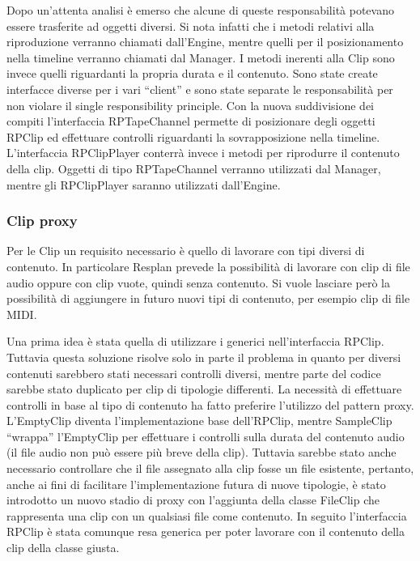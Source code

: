 \documentclass[a4paper,12pt]{report}
\begin{document}
Dopo un’attenta analisi è emerso che alcune di queste responsabilità potevano essere trasferite ad oggetti diversi. 
Si nota infatti che i metodi relativi alla riproduzione verranno chiamati dall’Engine, mentre quelli per il posizionamento nella timeline verranno chiamati dal Manager.
I metodi inerenti alla Clip sono invece quelli riguardanti la propria durata e il contenuto.
Sono state create interfacce diverse per i vari “client” e sono state separate le responsabilità per non violare il single responsibility principle.
Con la nuova suddivisione dei compiti l’interfaccia RPTapeChannel permette di posizionare degli oggetti RPClip ed effettuare controlli riguardanti la sovrapposizione nella timeline.
L’interfaccia RPClipPlayer conterrà invece i metodi per riprodurre il contenuto della clip.
Oggetti di tipo RPTapeChannel verranno utilizzati dal Manager, mentre gli RPClipPlayer saranno utilizzati dall’Engine.
\endsubsubsection
\subsubsection{Clip proxy}
Per le Clip un requisito necessario è quello di lavorare con tipi diversi di contenuto. In particolare Resplan prevede la possibilità di lavorare con clip di file audio oppure con clip vuote, quindi senza contenuto. Si vuole lasciare però la possibilità di aggiungere in futuro nuovi tipi di contenuto, per esempio clip di file MIDI.

Una prima idea è stata quella di utilizzare i generici nell’interfaccia RPClip. Tuttavia questa soluzione risolve solo in parte il problema in quanto per diversi contenuti sarebbero stati necessari controlli diversi, mentre parte del codice sarebbe stato duplicato per clip di tipologie differenti.
La necessità di effettuare controlli in base al tipo di contenuto ha fatto preferire l’utilizzo del pattern proxy.
L’EmptyClip diventa l’implementazione base dell’RPClip, mentre SampleClip “wrappa” l’EmptyClip per effettuare i controlli sulla durata del contenuto audio (il file audio non può essere più breve della clip).
Tuttavia sarebbe stato anche necessario controllare che il file assegnato alla clip fosse un file esistente, pertanto, anche ai fini di facilitare l’implementazione futura di nuove tipologie, è stato introdotto un nuovo stadio di proxy con l’aggiunta della classe FileClip che rappresenta una clip con un qualsiasi file come contenuto.
In seguito l’interfaccia RPClip è stata comunque resa generica per poter lavorare con il contenuto della clip della classe giusta.
\endsubsubsection
\end{document}
